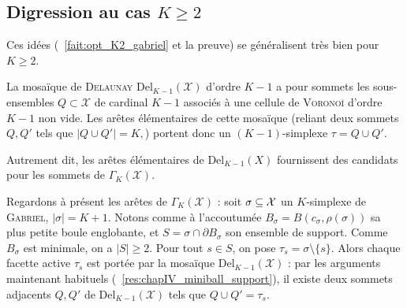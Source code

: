 


\subsection{Digression au cas $K \ge 2$}


Ces idées (\Fact~\ref{fait:opt_K2_gabriel} et la preuve) se généralisent très bien pour $K \ge 2$.

La mosaïque de \textsc{Delaunay} \(\mathrm{Del}_{K-1}(\mathcal X)\) d'ordre \(K-1\) a pour sommets les sous-ensembles
\(Q \subset \mathcal X\) de cardinal \(K-1\) associés à une cellule de \textsc{Voronoï} d'ordre \(K-1\) non vide. Les arêtes élémentaires de cette mosaïque (reliant deux sommets \(Q,Q'\) tels que
\(
        |Q \cup Q'| = K,
\))
portent donc un \((K-1)\)-simplexe
\(
        \tau = Q \cup Q' .
\)

Autrement dit, les arêtes élémentaires de \(\mathrm{Del}_{K-1}(X)\)
fournissent des candidats pour les sommets de \(\Gamma_K(\mathcal X)\).

Regardons à présent les arêtes de \(\Gamma_K(\mathcal X)\) : soit \(\sigma \subseteq \mathcal{X}\) un \(K\)-simplexe de \textsc{Gabriel}, \(|\sigma|=K+1\). Notons comme à l'accoutumée
\(
        B_\sigma = B(c_\sigma,\rho(\sigma))
\)
sa plus petite boule englobante, et
\(
        S = \sigma \cap \partial B_\sigma
\)
son ensemble de support. Comme \(B_\sigma\) est minimale, on a
\(|S|\geq 2\). Pour tout \(s\in S\), on pose
\(
        \tau_s = \sigma \setminus \{s\}.
\)
Alors chaque facette active \(\tau_s\) est portée par la mosaïque
\(\mathrm{Del}_{K-1}(\mathcal X)\) : par les arguments maintenant habituels (\Res~\ref{res:chapIV_miniball_support}), il existe deux sommets adjacents
\(Q,Q'\) de \(\mathrm{Del}_{K-1}(\mathcal X)\) tels que
\(
        Q\cup Q' = \tau_s .
\) 



